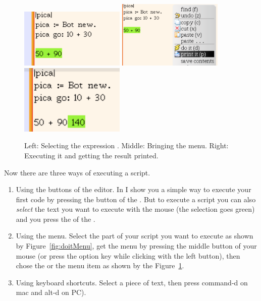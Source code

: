 \begin{figure}[h]
\includegraphics[width=5cm]{selectingExp}  \includegraphics[width=5cm]{selectMenu}\includegraphics[width=5cm]{resultExpression}
\caption{Left: Selecting the expression . Middle: Bringing the menu. Right: Executing it and getting the result printed.\label{fig:printitMenu}}
\end{figure}


Now there are three ways of executing a script.
\begin{enumerate}
\item Using the buttons of the \tw editor.  In  I show you a simple way to execute your first code by pressing the  button of the \tw. But to execute a script you can also \emph{select} the text you want to execute with the mouse (the selection goes green) and you press the  of the \tw.

\item Using the menu. Select the part of your script you want to execute as shown by  Figure~\ref{fig:doitMenu}, get the menu by pressing  the middle button of your mouse (or press the option key while clicking with the left button), then  chose the  or the  menu item as shown by the Figure~\ref{fig:printitMenu}. 

\item Using keyboard shortcuts. Select a piece of text, then press command-d on mac and alt-d on PC).
\end{enumerate}



